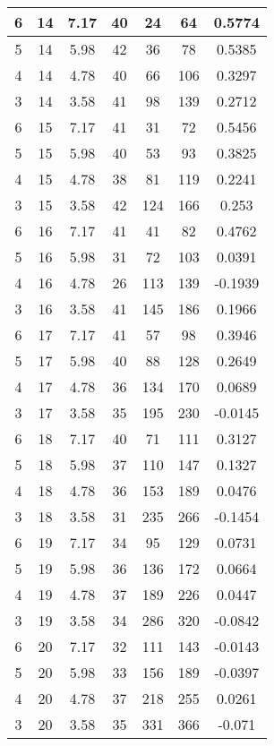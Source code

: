 \documentclass[letterpaper, 12pt]{article}
\begin{document}
\begin{longtable}{|c|c|c|c|c|c|c|}
\hline
6 & 14 & 7.17 & 40 & 24 & 64 & 0.5774 \\
\hline
5 & 14 & 5.98 & 42 & 36 & 78 & 0.5385 \\
\hline
4 & 14 & 4.78 & 40 & 66 & 106 & 0.3297 \\
\hline
3 & 14 & 3.58 & 41 & 98 & 139 & 0.2712 \\
\hline
6 & 15 & 7.17 & 41 & 31 & 72 & 0.5456 \\
\hline
5 & 15 & 5.98 & 40 & 53 & 93 & 0.3825 \\
\hline
4 & 15 & 4.78 & 38 & 81 & 119 & 0.2241 \\
\hline
3 & 15 & 3.58 & 42 & 124 & 166 & 0.253 \\
\hline
6 & 16 & 7.17 & 41 & 41 & 82 & 0.4762 \\
\hline
5 & 16 & 5.98 & 31 & 72 & 103 & 0.0391 \\
\hline
4 & 16 & 4.78 & 26 & 113 & 139 & -0.1939 \\
\hline
3 & 16 & 3.58 & 41 & 145 & 186 & 0.1966 \\
\hline
6 & 17 & 7.17 & 41 & 57 & 98 & 0.3946 \\
\hline
5 & 17 & 5.98 & 40 & 88 & 128 & 0.2649 \\
\hline
4 & 17 & 4.78 & 36 & 134 & 170 & 0.0689 \\
\hline
3 & 17 & 3.58 & 35 & 195 & 230 & -0.0145 \\
\hline
6 & 18 & 7.17 & 40 & 71 & 111 & 0.3127 \\
\hline
5 & 18 & 5.98 & 37 & 110 & 147 & 0.1327 \\
\hline
4 & 18 & 4.78 & 36 & 153 & 189 & 0.0476 \\
\hline
3 & 18 & 3.58 & 31 & 235 & 266 & -0.1454 \\
\hline
6 & 19 & 7.17 & 34 & 95 & 129 & 0.0731 \\
\hline
5 & 19 & 5.98 & 36 & 136 & 172 & 0.0664 \\
\hline
4 & 19 & 4.78 & 37 & 189 & 226 & 0.0447 \\
\hline
3 & 19 & 3.58 & 34 & 286 & 320 & -0.0842 \\
\hline
6 & 20 & 7.17 & 32 & 111 & 143 & -0.0143 \\
\hline
5 & 20 & 5.98 & 33 & 156 & 189 & -0.0397 \\
\hline
4 & 20 & 4.78 & 37 & 218 & 255 & 0.0261 \\
\hline
3 & 20 & 3.58 & 35 & 331 & 366 & -0.071 \\
\hline
\end{longtable}
\end{document}
